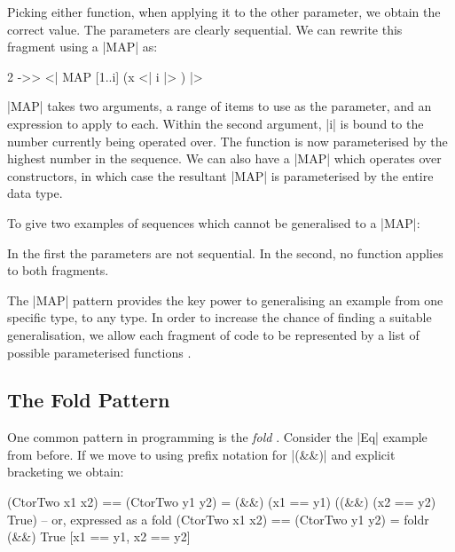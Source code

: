 \documentclass{llncs}
\begin{document}
\begin{code}
[1 ->> x <| i |>, 2 ->> x <| i |>]
\end{code}

Picking either function, when applying it to the other parameter, we obtain the correct value. The parameters are clearly sequential. We can rewrite this fragment using a |MAP| as:

\begin{code}
2 ->> <| MAP [1..i] (x <| i |> ) |>
\end{code}

|MAP| takes two arguments, a range of items to use as the parameter, and an expression to apply to each. Within the second argument, |i| is bound to the number currently being operated over. The function is now parameterised by the highest number in the sequence. We can also have a |MAP| which operates over constructors, in which case the resultant |MAP| is parameterised by the entire data type.

To give two examples of sequences which cannot be generalised to a |MAP|:

\begin{code}
[1 ->> x <| i |>, 3 ->> x <| i |>]
[1 ->> x <| i |>, 2 ->> y <| i |>]
\end{code}

In the first the parameters are not sequential. In the second, no function applies to both fragments.

The |MAP| pattern provides the key power to generalising an example from one specific type, to any type. In order to increase the chance of finding a suitable generalisation, we allow each fragment of code to be represented by a list of possible parameterised functions \cite{wadler:list_successes}.


\subsection{The Fold Pattern}
\label{sec:fold}

One common pattern in programming is the \textit{fold} \cite{hutton:fold}. Consider the |Eq| example from before. If we move to using prefix notation for |(&&)| and explicit bracketing we obtain:

\begin{code}
(CtorTwo x1 x2) == (CtorTwo y1 y2) = (&&) (x1 == y1) ((&&) (x2 == y2) True)
 -- or, expressed as a fold
(CtorTwo x1 x2) == (CtorTwo y1 y2) = foldr (&&) True [x1 == y1, x2 == y2]
\end{code}
\end{document}
